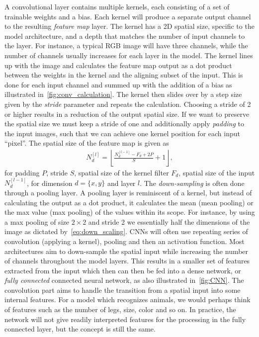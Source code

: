 A convolutional layer contains multiple kernels, each consisting of a set of
trainable weights and a bias. Each kernel will produce a separate output channel
to the resulting \textit{feature map} layer. The kernel has a 2D spatial size,
specific to the model architecture, and a depth that matches the number of input
channels to the layer. For instance, a typical RGB image will have three
channels, while the number of channels usually increases for each layer in the
model. The kernel lines up with the image and calculates the feature map output
as a dot product between the weights in the kernel and the aligning subset of
the input. This is done for each input channel and summed up with the addition
of a bias as illustrated in~\cref{fig:conv_calculation}. The kernel then slides over by a
step size given by the \textit{stride} parameter and repeats the
calculation. Choosing a stride of 2 or higher results in a reduction of the
output spatial size. If we want to preserve the spatial size we must keep a
stride of one and additionally apply \textit{padding} to the input images, such
that we can achieve one kernel position for each input ``pixel''. The spatial
size of the feature map is given as
\begin{align}
  N_d^{[l]} = \left\lfloor \frac{N_d^{[l-1]} - F_d + 2P}{S} + 1 \right\rfloor,
  \label{eq:down_scaling}
\end{align}
for padding $P$, stride $S$, spatial size of the kernel filter $F_d$, spatial
size of the input $N_d^{[l-1]}$, for dimension $d = \{x, y\}$ and layer $l$. The
\textit{down-sampling} is often done through a pooling layer. A pooling layer is
reminiscent of a kernel, but instead of calculating the output as a dot product,
it calculates the mean (mean pooling) or the max value (max pooling) of the
values within its scope. For instance, by using a max pooling of size $2 \times
2$ and stride 2 we essentially half the dimensions of the image as dictated
by~\cref{eq:down_scaling}. \acrshort{CNN}s will often use repeating series of
convolution (applying a kernel), pooling and then an activation function. Most
architectures aim to down-sample the spatial input while increasing the number
of channels throughout the model layers. This results in a smaller set of
features extracted from the input which then can then be fed into a dense
network, or \textit{fully connected} connected neural network, as also
illustrated in~\cref{fig:CNN}. The convolution part aims to
handle the transition from a spatial input into some internal features. For a model which recognizes animals, we would perhaps think of features such as the number of legs, size, color and so on. In practice, the network will not give readily interpreted features for the processing in the fully connected layer, but the concept is still the same. 


